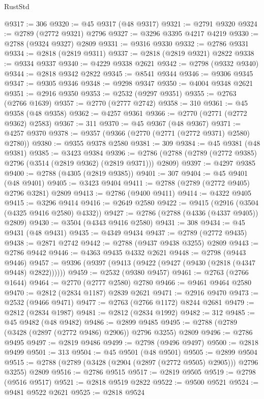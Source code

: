 \begin{lexlean}{RustStd}
\begin{coremodule}
@9317 := 306
@9320 := @45 @9317 (@48 @9317)
@9321 := @2791 @9320
@9324 := @2789 (@2772 @9321) @2796
@9327 := @3296 @3395 @4217 @4219
@9330 := @2788 (@9324 @9327) @2809
@9331 := @9316 @9330
@9332 := @2786 @9331
@9334 := @2818 (@2819 @9311)
@9337 := @2818 (@2819 @9321) @2822
@9338 := @9334 @9337
@9340 := @4229 @9338 @2621
@9342 := @2798 (@9332 @9340)
@9344 := @2818 @9342 @2822
@9345 := @8541 @9344
@9346 := @9306 @9345
@9347 := @9305 @9346
@9348 := @9298 @9347
@9350 := @4004 @9348 @2621
@9351 := @2916 @9350
@9353 := @2532 (@9297 @9351)
@9355 := @2763 (@2766 @1639)
@9357 := @2770 (@2777 @2742)
@9358 := 310
@9361 := @45 @9358 (@48 @9358)
@9362 := @4257 @9361
@9366 := @2770 (@2771 (@2772 @9362) @2583)
@9367 := 311
@9370 := @45 @9367 (@48 @9367)
@9371 := @4257 @9370
@9378 := @9357 (@9366 (@2770 (@2771 (@2772 @9371) @2580) @2780))
@9380 := @9355 @9378 @2580
@9381 := 309
@9384 := @45 @9381 (@48 @9381)
@9385 := @3423 @9384
@9396 := @2786 (@2788 (@2789 (@2772 @9385) @2796 (@3514 (@2819 @9362) (@2819 @9371))) @2809)
@9397 := @4297 @9385
@9400 := @2788 (@4305 (@2819 @9385))
@9401 := 307
@9404 := @45 @9401 (@48 @9401)
@9405 := @3423 @9404
@9411 := @2788 (@2789 (@2772 @9405) @2796 @3281) @2809
@9413 := @2786 (@9400 @9411)
@9414 := @4322 @9405
@9415 := @3296 @9414
@9416 := @2649 @2580
@9422 := @9415 (@2916 (@3504 (@4325 @9416 @2580) @4332))
@9427 := @2786 (@2788 (@4336 (@4337 @9405)) @2809)
@9430 := @3504 (@4343 @9416 @2580)
@9431 := 308
@9434 := @45 @9431 (@48 @9431)
@9435 := @4349 @9434
@9437 := @2789 (@2772 @9435)
@9438 := @2871 @2742
@9442 := @2788 (@9437 @9438 @3255) @2809
@9443 := @2786 @9442
@9446 := @4363 @9435 @4332 @2621
@9448 := @2798 (@9443 @9446)
@9457 := @9396 (@9397 (@9413 (@9422 (@9427 (@9430 (@2818 (@4347 @9448) @2822))))))
@9459 := @2532 (@9380 @9457)
@9461 := @2763 (@2766 @1644)
@9464 := @2770 (@2777 @2580) @2780
@9466 := @9461 @9464 @2580
@9470 := @2812 (@2834 @1187) @2839 @2621
@9471 := @2916 @9470
@9473 := @2532 (@9466 @9471)
@9477 := @2763 (@2766 @1172) @8244 @2681
@9479 := @2812 (@2834 @1987)
@9481 := @2812 (@2834 @1992)
@9482 := 312
@9485 := @45 @9482 (@48 @9482)
@9486 := @2899 @9485
@9495 := @2788 (@2789 (@3428 (@2897 (@2772 @9486) @2906)) @2796 @3255) @2809
@9496 := @2786 @9495
@9497 := @2819 @9486
@9499 := @2798 (@9496 @9497)
@9500 := @2818 @9499
@9501 := 313
@9504 := @45 @9501 (@48 @9501)
@9505 := @2899 @9504
@9515 := @2788 (@2789 (@3428 (@2904 (@2897 (@2772 @9505) @2905))) @2796 @3255) @2809
@9516 := @2786 @9515
@9517 := @2819 @9505
@9519 := @2798 (@9516 @9517)
@9521 := @2818 @9519 @2822
@9522 := @9500 @9521
@9524 := @9481 @9522 @2621
@9525 := @2818 @9524

\end{coremodule}
\end{lexlean}
